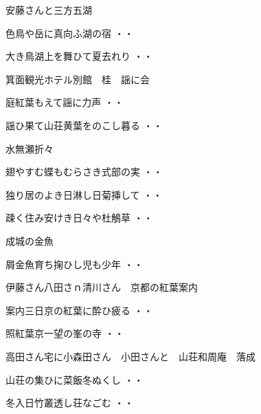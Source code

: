 \vspace{ 0.4cm}
安藤さんと三方五湖
\begin{shiika}色鳥や岳に真向ふ湖の宿
\hfill{・・}\end{shiika}
\begin{shiika}大き鳥湖上を舞ひて夏去れり
\hfill{・・}\end{shiika}
\vspace{ 0.4cm}
箕面観光ホテル別館　桂　謡に会
\begin{shiika}庭紅葉もえて謡に力声
\hfill{・・}\end{shiika}
\begin{shiika}謡ひ果て山荘黄葉をのこし暮る
\hfill{・・}\end{shiika}
\vspace{ 0.4cm}
水無瀬折々
\begin{shiika}翅やすむ蝶もむらさき式部の実
\hfill{・・}\end{shiika}
\begin{shiika}独り居のよき日淋し日菊挿して
\hfill{・・}\end{shiika}
\begin{shiika}疎く住み安けき日々や杜鵤草
\hfill{・・}\end{shiika}
\vspace{ 0.4cm}
成城の金魚
\begin{shiika}屑金魚育ち掬ひし児も少年
\hfill{・・}\end{shiika}
\vspace{ 0.4cm}
伊藤さん八田さｎ清川さん　京都の紅葉案内
\begin{shiika}案内三日京の紅葉に酔ひ疲る
\hfill{・・}\end{shiika}
\vspace{ 0.4cm}
\begin{shiika}照紅葉京一望の峯の寺
\hfill{・・}\end{shiika}
\vspace{ 0.4cm}
高田さん宅に小森田さん　小田さんと　山荘和周庵　落成
\begin{shiika}山荘の集ひに菜飯冬ぬくし
\hfill{・・}\end{shiika}
\begin{shiika}冬入日竹叢透し荘なごむ
\hfill{・・}\end{shiika}

